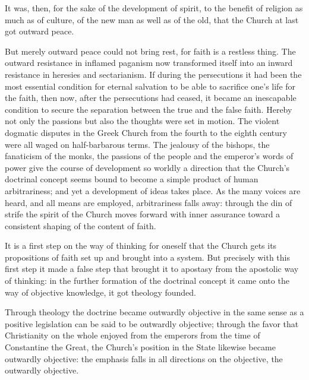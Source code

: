 \documentclass[12pt]{book}
\newcommand{\opage}[1]{\marginnote{\footnotesize\textit{[#1]}}}
\begin{document}
It was, then, for the sake of the development of spirit, to the benefit of
religion as much as of culture, of the new man as well as of the old, that the
Church at last got outward peace.

But merely outward peace could not bring rest, for faith is a restless thing.
The outward resistance in inflamed paganism now transformed itself into an
inward resistance in heresies and sectarianism. If
\opage{259}\setcounter{footnote}{0}%
during the persecutions it had been the most essential condition for eternal
salvation to be able to sacrifice one's life for the faith, then now, after the
persecutions had ceased, it became an inescapable condition to secure the
separation between the true and the false faith. Hereby not only the passions
but also the thoughts were set in motion. The violent dogmatic disputes in the
Greek Church from the fourth to the eighth century were all waged on
half-barbarous terms. The jealousy of the bishops, the fanaticism of the
monks, the passions of the people and the emperor's words of power give the
course of development so worldly a direction that the Church's doctrinal
concept seems bound to become a simple product of human arbitrariness; and yet
a development of ideas takes place. As the many voices are heard, and all
means are employed, arbitrariness falls away: through the din of strife the
spirit of the Church moves forward with inner assurance toward a consistent
shaping of the content of faith.

It is a first step on the way of thinking for oneself that the Church gets its
propositions of faith set up and brought into a system. But precisely with
this first step it made a false step that brought it to apostasy from the
apostolic way of thinking: in the further formation of the doctrinal concept
it came onto the way of objective knowledge, it got theology founded.

Through theology the doctrine became outwardly objective in the same sense as a
positive legislation can be said to be outwardly objective; through the favor
that Christianity on the whole enjoyed from the emperors from the time of
Constantine the Great, the Church's position in the State likewise became
outwardly objective: the emphasis falls in all directions on the objective,
the outwardly objective.
\end{document}

